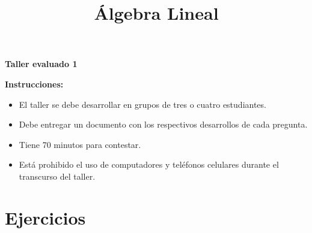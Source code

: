 \documentclass[12pt]{article}
\title{\'Algebra Lineal}
\date{}
\theoremstyle{exampstyle}
\theoremstyle{definition}
\theoremstyle{break}
\numberwithin{equation}{section}
\begin{document}

\begin{minipage}[r]{15cm}


\end{minipage}

\begin{center}
\Large{\textbf{Taller evaluado 1  }}
\end{center}
{\small\textbf{Instrucciones: }
\begin{itemize}
    \item El taller se debe desarrollar en grupos de tres o cuatro estudiantes.
    \item Debe entregar un documento con los respectivos desarrollos de cada pregunta.
    \item Tiene 70 minutos para contestar.
    \item Está prohibido el uso de computadores y teléfonos celulares durante el transcurso del taller.

\end{itemize}}
\section{Ejercicios}
\end{document}
